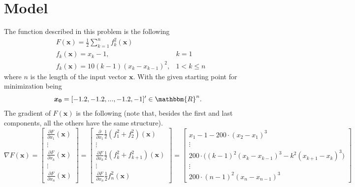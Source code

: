 \section{Model}
The function described in this problem is the following 
\begin{equation*}
\begin{aligned}
    &F(\boldsymbol{x}) = \frac{1}{2}\sum_{k=1}^n f_k^2(\boldsymbol{x}) \\
    &f_k(\boldsymbol{x}) = x_k-1, & k=1 \\
    &f_k(\boldsymbol{x}) = 10(k-1)(x_k-x_{k-1})^2, & 1<k\leq n
\end{aligned}
\end{equation*}
where $n$ is the length of the input vector $\boldsymbol{x}$.
With the given starting point for minimization being 
$$\boldsymbol{x_0}=[-1.2,-1.2,...,-1.2,-1]' \in \mathbbm{R}^n.$$
The gradient of $F(\boldsymbol{x})$ is the following (note that, besides the first and last components, all the others have the same structure).
\begin{equation*}
    \nabla F(\mathbf{x}) = 
    \begin{bmatrix}
        \frac{\partial F}{\partial x_1}(\mathbf{\boldsymbol{x}}) \\
        \vdots \\
        \frac{\partial F}{\partial x_k}(\mathbf{\boldsymbol{x}}) \\
        \vdots \\
        \frac{\partial F}{\partial x_n}(\mathbf{\boldsymbol{x}})
    \end{bmatrix}
    =
    \begin{bmatrix}
        \frac{\partial }{\partial x_1}\frac{1}{2}(f_1^2+f_2^2)(\boldsymbol{x}) \\
        \vdots \\
        \frac{\partial F}{\partial x_k}\frac{1}{2}(f_k^2+f_{k+1}^2)(\boldsymbol{x}) \\
        \vdots \\
        \frac{\partial F}{\partial x_n}\frac{1}{2}f_n^2(\boldsymbol{x})
    \end{bmatrix}
    =
    \begin{bmatrix}
        x_1-1-200\cdot (x_2-x_1)^3 \\
        \vdots \\
        200 \cdot \Big((k-1)^2(x_k-x_{k-1})^3-k^2(x_{k+1}-x_k)^3\Big)\\
        \vdots \\
        200 \cdot (n-1)^2(x_n-x_{n-1})^3
    \end{bmatrix}
\end{equation*}
